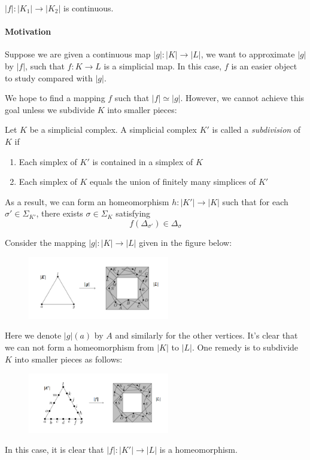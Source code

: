 \begin{remark}
$|f|:|K_1|\to|K_2|$ is continuous.
\end{remark}
\paragraph{Motivation}
Suppose we are given a continuous map $|g|:|K|\to|L|$, we want to {approximate} $|g|$ by $|f|$, such that $f:K\to L$ is a simplicial map.
In this case, $f$ is an easier object to study compared with $|g|$.

We hope to find a mapping $f$ such that $|f|\simeq |g|$. However, we cannot achieve this goal unless we subdivide $K$ into smaller pieces:

\begin{definition}[Subdivision]
Let $K$ be a simplicial complex.
A simplicial complex $K'$ is called a \emph{subdivision} of $K$ if
\begin{enumerate}
\item
Each simplex of $K'$ is contained in a simplex of $K$
\item
Each simplex of $K$ equals the union of finitely many simplices of $K'$
\end{enumerate}
As a result, we can form an homeomorphism $h:|K'|\to|K|$ such that for each $\sigma'\in\Sigma_{K'}$, there exists $\sigma\in\Sigma_K$ satisfying
\[
f(\Delta_{\sigma'})\in\Delta_{\sigma}
\]
\end{definition}

\begin{example}
Consider the mapping $|g|:|K|\to|L|$ given in the figure below:
\begin{figure}[H]
\centering
\includegraphics[width=0.55\textwidth]{week9/p_7}
\end{figure}
Here we denote $|g|(a)$ by $A$ and similarly for the other vertices.
It's clear that we can not form a homeomorphism from $|K|$ to $|L|$. One remedy is to subdivide $K$ into smaller pieces as follows: 
\begin{figure}[H]
\centering
\includegraphics[width=0.55\textwidth]{week9/p_8}
\end{figure}
In this case, it is clear that $|f|:|K'|\to|L|$ is a homeomorphism.
\end{example}


